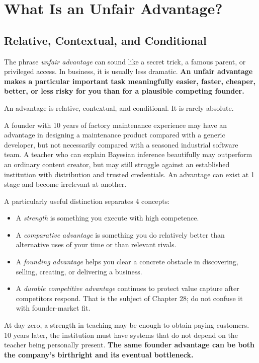 \section{What Is an Unfair Advantage?}

\subsection{Relative, Contextual, and Conditional}

The phrase \textit{unfair advantage} can sound like a secret trick, a famous parent, or privileged access. In business, it is usually less dramatic. \textbf{An unfair advantage makes a particular important task meaningfully easier, faster, cheaper, better, or less risky for you than for a plausible competing founder.}

An advantage is relative, contextual, and conditional. It is rarely absolute.

A founder with 10 years of factory maintenance experience may have an advantage in designing a maintenance product compared with a generic developer, but not necessarily compared with a seasoned industrial software team. A teacher who can explain Bayesian inference beautifully may outperform an ordinary content creator, but may still struggle against an established institution with distribution and trusted credentials. An advantage can exist at 1 stage and become irrelevant at another.

A particularly useful distinction separates 4 concepts:

\begin{itemize}[leftmargin=11pt,itemsep=1.5pt,topsep=1.5pt,parsep=0pt]
  \item A \textit{strength} is something you execute with high competence.
  \item A \textit{comparative advantage} is something you do relatively better than alternative uses of your time or than relevant rivals.
  \item A \textit{founding advantage} helps you clear a concrete obstacle in discovering, selling, creating, or delivering a business.
  \item A \textit{durable competitive advantage} continues to protect value capture after competitors respond. That is the subject of Chapter 28; do not confuse it with founder-market fit.
\end{itemize}

At day zero, a strength in teaching may be enough to obtain paying customers. 10 years later, the institution must have systems that do not depend on the teacher being personally present. \textbf{The same founder advantage can be both the company's birthright and its eventual bottleneck.}

